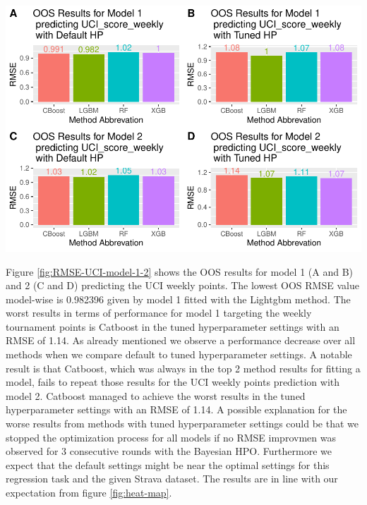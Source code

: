 \documentclass[12pt,a4paper]{article}
\let\origfigure\figure
\let\endorigfigure\endfigure
\renewenvironment{figure}[1][2] {
    \expandafter\origfigure\expandafter[H]
} {
    \endorigfigure
}
\begin{document}
\begin{figure}[!H]
\includegraphics{Master_Thesis_files/figure-latex/RMSE-UCI-model-1-2-1} \caption{OOS results for UCI weekly points prediction with model 1 and 2}\label{fig:RMSE-UCI-model-1-2}
\end{figure}

Figure \ref{fig:RMSE-UCI-model-1-2} shows the OOS results for model 1 (A and B) and 2 (C and D) predicting the UCI weekly points. The lowest OOS RMSE value model-wise is 0.982396 given by model 1 fitted with the Lightgbm method. The worst results in terms of performance for model 1 targeting the weekly tournament points is Catboost in the tuned hyperparameter settings with an RMSE of 1.14. As already mentioned we observe a performance decrease over all methods when we compare default to tuned hyperparameter settings. A notable result is that Catboost, which was always in the top 2 method results for fitting a model, fails to repeat those results for the UCI weekly points prediction with model 2. Catboost managed to achieve the worst results in the tuned hyperparameter settings with an RMSE of 1.14. A possible explanation for the worse results from methods with tuned hyperparameter settings could be that we stopped the optimization process for all models if no RMSE improvmen was observed for 3 consecutive rounds with the Bayesian HPO. Furthermore we expect that the default settings might be near the optimal settings for this regression task and the given Strava dataset. The results are in line with our expectation from figure \ref{fig:heat-map}.
\end{document}
